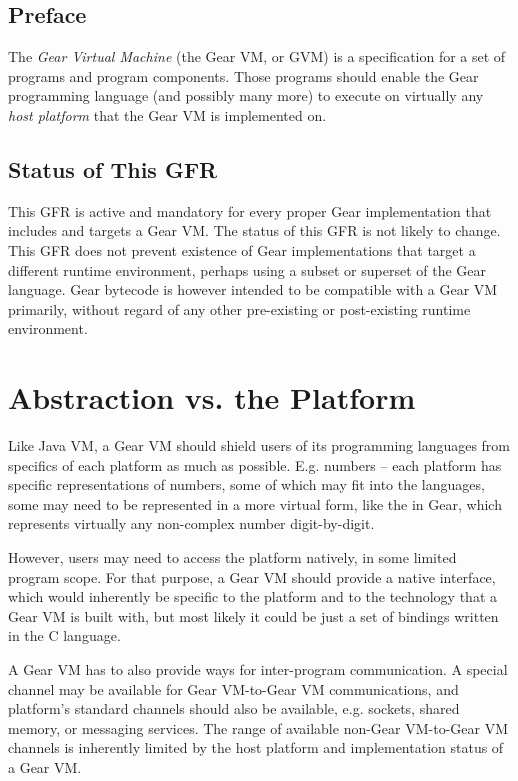 
\section*{Preface}

The {\em Gear Virtual Machine} (the Gear VM, or GVM) is a specification for a set of programs and program components. Those programs should enable the Gear programming language (and possibly many more) to execute on virtually any {\em host platform} that the Gear VM is implemented on. 




\section*{Status of This GFR}

This GFR is active and mandatory for every proper Gear implementation that includes and targets a Gear VM. The status of this GFR is not likely to change. This GFR does not prevent existence of Gear implementations that target a different runtime environment, perhaps using a subset or superset of the Gear language. Gear bytecode is however intended to be compatible with a Gear VM primarily, without regard of any other pre-existing or post-existing runtime environment. 






\chapter{Abstraction vs. the Platform}

Like Java VM, a Gear VM should shield users of its programming languages from specifics of each platform as much as possible. E.g. numbers -- each platform has specific representations of numbers, some of which may fit into the languages, some may need to be represented in a more virtual form, like the  in Gear, which represents virtually any non-complex number digit-by-digit. 

However, users may need to access the platform natively, in some limited program scope. For that purpose, a Gear VM should provide a native interface, which would inherently be specific to the platform and to the technology that a Gear VM is built with, but most likely it could be just a set of bindings written in the C language. 

A Gear VM has to also provide ways for inter-program communication. A special channel may be available for Gear VM-to-Gear VM communications, and platform's standard channels should also be available, e.g. sockets, shared memory, or messaging services. The range of available non-Gear VM-to-Gear VM channels is inherently limited by the host platform and implementation status of a Gear VM. 





